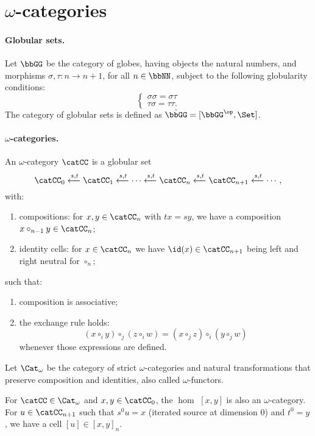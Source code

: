 \documentclass{article}
\begin{document}
\section{$\omega$-categories}

\paragraph*{Globular sets. } Let $\bbGG$ be the category of globes, having objects the natural numbers, and morphisms $\sigma, \tau : n \longrightarrow n+1$, for all $n \in \bbNN$, subject to the following globularity conditions:
\[ \left\{ \begin{array}{l}
	\sigma \sigma = \sigma \tau \\ \tau \sigma = \tau \tau .
\end{array} \right. \]
The category of globular sets is defined as $\hat{\bbGG} = [ \bbGG^\op, \Set ]$.

\paragraph*{$\omega$-categories. } An $\omega$-category $\catCC$ is a globular set
\[ \catCC_0 \xleftarrow{s, t} \catCC_1 \xleftarrow{s, t} \cdots \xleftarrow{s, t} \catCC_n \xleftarrow{s, t} \catCC_{n+1} \xleftarrow{s, t} \cdots , \]
with:
\begin{enumerate}
	\item compositions: for $x, y \in \catCC_n$ with $tx = sy$, we have a composition $x \circ_{n-1} y \in \catCC_n$;
	\item identity cells: for $x \in \catCC_n$ we have $\id (x) \in \catCC_{n+1}$ being left and right neutral for $\circ_n$;
\end{enumerate}
such that:
\begin{enumerate}
	\item composition is associative;
	\item the exchange rule holds:
		\[ (x \circ_i y) \circ_j (z \circ_i w) = (x \circ_j z) \circ_i (y \circ_j w) \]
		whenever those expressions are defined.
\end{enumerate}
Let $\Cat_\omega$ be the category of strict $\omega$-categories and natural transformations that preserve composition and identities, also called $\omega$-functors.

For $\catCC \in \Cat_\omega$ and $x, y \in \catCC_0$, the $\hom$ $[x, y]$ is also an $\omega$-category. For $u \in \catCC_{n+1}$ such that $s^0 u = x$ (iterated source at dimension $0$) and $t^0 = y$, we have a cell $[u] \in [x, y]_n$.
\end{document}
